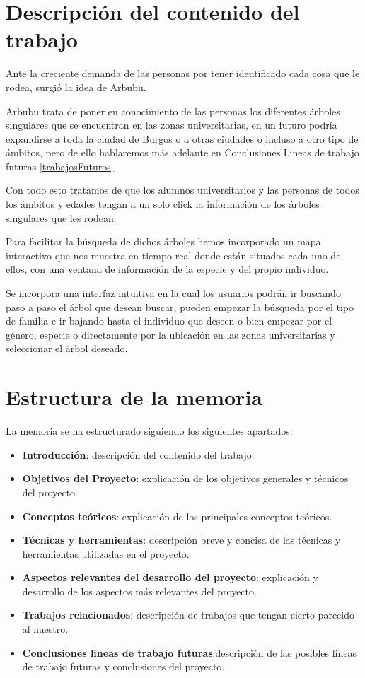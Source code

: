 
\section{Descripción del contenido del trabajo}
Ante la creciente demanda de las personas por tener identificado cada cosa que le rodea, surgió la idea de Arbubu.

Arbubu trata de poner en conocimiento de las personas los diferentes árboles singulares que se encuentran en las zonas universitarias, en un futuro podría expandirse a toda la ciudad de Burgos o a otras ciudades o incluso a otro tipo de ámbitos, pero de ello hablaremos más adelante en Conclusiones Lineas de trabajo futuras
\ref{trabajosFuturos} 

Con todo esto tratamos de que los alumnos universitarios y las personas de todos los ámbitos y edades tengan a un solo click la información de los árboles singulares que les rodean.

Para facilitar la búsqueda de dichos árboles hemos incorporado un mapa interactivo que nos muestra en tiempo real donde están situados cada uno de ellos, con una ventana de información de la especie y del propio individuo.

Se incorpora una interfaz intuitiva en la cual los usuarios podrán ir buscando paso a paso el árbol que desean buscar, pueden empezar la búsqueda por el tipo de familia e ir bajando hasta el individuo que deseen o bien empezar por el género, especie o directamente por la ubicación en las zonas universitarias y seleccionar el árbol deseado.
\newpage


\section{Estructura de la memoria}
La memoria se ha estructurado siguiendo los siguientes apartados:
\begin{itemize}
	\item \textbf{Introducción}: descripción del contenido del trabajo.
	\item \textbf{Objetivos del Proyecto}: explicación de los objetivos generales y técnicos del proyecto.
	\item \textbf{Conceptos teóricos}: explicación de los principales conceptos teóricos.
	\item \textbf{Técnicas y herramientas}: descripción breve y concisa de las técnicas y herramientas utilizadas en el proyecto.
	\item \textbf{Aspectos relevantes del desarrollo del proyecto}: explicación y desarrollo de los aspectos más relevantes del proyecto.
	\item \textbf{Trabajos relacionados}: descripción de trabajos que tengan cierto parecido al nuestro.
	\item \textbf{Conclusiones lineas de trabajo futuras}:descripción de las posibles líneas de trabajo futuras y conclusiones del proyecto.
\end{itemize}

